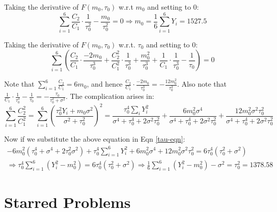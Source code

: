 \documentclass{article}
\begin{document}
\begin{flushleft}
Taking the derivative of \(F(m_{0}, \tau_{0})\) w.r.t \(m_{0}\) and setting to \(0\):
\begin{equation}
\sum_{i=1}^{6} \frac{C_{2}}{C_{1}}\cdot\frac{1}{\tau_{0}^{2}} - \frac{m_{0}}{\tau_{0}^{2}} = 0 \Rightarrow m_{0} = \frac{1}{6}\sum_{i=1}^{6}Y_{i} = \boxed{1527.5}
\end{equation}

Taking the derivative of \(F(m_{0}, \tau_{0})\) w.r.t. \(\tau_{0}\) and setting to \(0\):
\begin{equation}
\label{tau-eqn}
\sum_{i=1}^{6} \left(\frac{C_{2}}{C_{1}}\cdot\frac{-2m_{0}}{\tau_{0}^{3}} + \frac{C_{2}^{2}}{C_{1}^{2}}\cdot\frac{1}{\tau_{0}^{3}} + \frac{m_{0}^{2}}{\tau_{0}^{3}} + \frac{1}{C_{1}}\cdot\frac{1}{\tau_{0}^{3}} - \frac{1}{\tau_{0}}\right) = 0
\end{equation}

Note that \(\sum_{i=1}^{6}\frac{C_{2}}{C_{1}} = 6m_{0}\), and hence \(\frac{C_{2}}{C_{1}}\cdot\frac{-2m_{0}}{\tau_{0}^{3}} = -\frac{12m_{0}^{2}}{\tau_{0}^{3}}\). Also note that \(\frac{1}{C_{1}}\cdot\frac{1}{\tau_{0}^{3}} - \frac{1}{\tau_{0}} = -\frac{\tau_{0}}{\tau_{0}^{2} + \sigma^{2}}\). The complication arises in:
\begin{equation}
\sum_{i=1}^{6}\frac{C_{2}^{2}}{C_{1}^{2}} = \sum_{i=1}^{6}\left(\frac{\tau_{0}^{2}Y_{i} + m_{0}\sigma^{2}}{\sigma^{2} + \tau_{0}^{2}}\right)^{2} = \frac{\tau_{0}^{4}\sum_{i} Y_{i}^{2}}{\sigma^{4} + \tau_{0}^{4} + 2\sigma^{2}\tau_{0}^{2}} + \frac{6m_{0}^{2}\sigma^{4}}{\sigma^{4} + \tau_{0}^{4} + 2\sigma^{2}\tau_{0}^{2}} + \frac{12m_{0}^{2}\sigma^{2}\tau_{0}^{2}}{\sigma^{4} + \tau_{0}^{4} + 2\sigma^{2}\tau_{0}^{2}}
\end{equation}

Now if we substitute the above equation in Eqn \ref{tau-eqn}:
\begin{multline}
-6m_{0}^{2}(\tau_{0}^4 + \sigma^{4} + 2\tau_{0}^{2}\sigma^{2}) + \tau_{0}^{4}\sum_{i=1}^{6} Y_{i}^{2} + 6m_{0}^{2}\sigma^{4} + 12m_{0}^{2}\sigma^{2}\tau_{0}^{2} = 6\tau_{0}^{4} (\tau_{0}^{2} + \sigma^{2}) \\
\Rightarrow \tau_{0}^{4}\sum_{i=1}^{6}(Y_{i}^{2} - m_{0}^{2}) = 6\tau_{0}^{4}(\tau_{0}^{2} + \sigma^{2}) \Rightarrow \frac{1}{6}\sum_{i=1}^{6}(Y_{i}^{2} - m_{0}^{2}) - \sigma^{2} = \tau_{0}^{2} = \boxed{1378.58}
\end{multline}
\end{flushleft}

\section*{Starred Problems}
\end{document}
